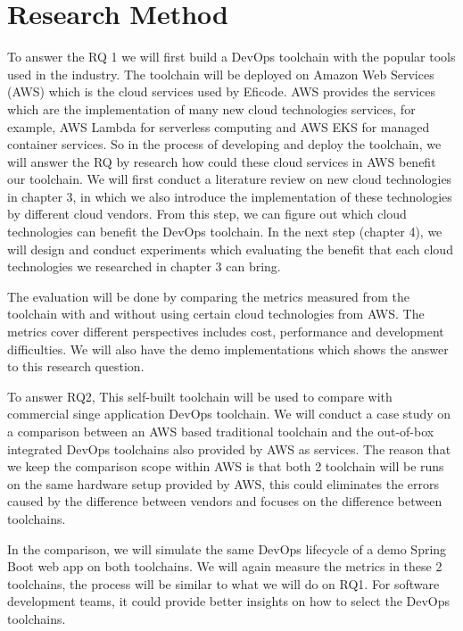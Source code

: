\section{Research Method}
To answer the RQ 1 we will first build a DevOps toolchain with the popular tools used in the industry. The toolchain will be deployed on Amazon Web Services (AWS) which is the cloud services used by Eficode. AWS provides the services which are the implementation of many new cloud technologies services, for example, AWS Lambda for serverless computing and AWS EKS for managed container services. 
So in the process of developing and deploy the toolchain, we will answer the RQ by research how could these cloud services in AWS benefit our toolchain. We will first conduct a literature review on new cloud technologies in chapter 3, in which we also introduce the implementation of these technologies by different cloud vendors. From this step, we can figure out which cloud technologies can benefit the DevOps toolchain. In the next step (chapter 4), we will design and conduct experiments which evaluating the benefit that each cloud technologies we researched in chapter 3 can bring. 
\par
The evaluation will be done by comparing the metrics measured from the toolchain with and without using certain cloud technologies from AWS. The metrics cover different perspectives includes cost, performance and development difficulties. We will also have the demo implementations which shows the answer to this research question.
\par
To answer RQ2, This self-built toolchain will be used to compare with commercial singe application DevOps toolchain. We will conduct a case study on a comparison between an AWS based traditional toolchain and the out-of-box integrated DevOps toolchains also provided by AWS as services. The reason that we keep the comparison scope within AWS is that both 2 toolchain will be runs on the same hardware setup provided by AWS, this could eliminates the errors caused by the difference between vendors and focuses on the difference between toolchains.
\par
In the comparison, we will simulate the same DevOps lifecycle of a demo Spring Boot web app on both toolchains. We will again measure the metrics in these 2 toolchains, the process will be similar to what we will do on RQ1.
For software development teams, it could provide better insights on how to select the DevOps toolchains.
